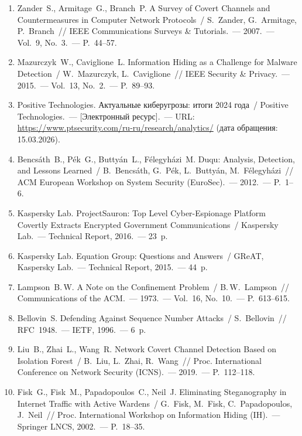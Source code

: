 \begin{enumerate}
  \item Zander~S., Armitage~G., Branch~P. A Survey of Covert Channels and Countermeasures in Computer Network Protocols~/ S.~Zander, G.~Armitage, P.~Branch~// IEEE Communications Surveys \& Tutorials.~--- 2007.~--- Vol.~9, No.~3.~--- P.~44--57.

  \item Mazurczyk~W., Caviglione~L. Information Hiding as a Challenge for Malware Detection~/ W.~Mazurczyk, L.~Caviglione~// IEEE Security \& Privacy.~--- 2015.~--- Vol.~13, No.~2.~--- P.~89--93.

  \item Positive Technologies. Актуальные киберугрозы: итоги 2024 года~/ Positive Technologies.~--- [Электронный ресурс].~--- URL: \url{https://www.ptsecurity.com/ru-ru/research/analytics/} (дата обращения: 15.03.2026).

  \item Bencs\'{a}th~B., P\'{e}k~G., Butty\'{a}n~L., F\'{e}legyh\'{a}zi~M. Duqu: Analysis, Detection, and Lessons Learned~/ B.~Bencs\'{a}th, G.~P\'{e}k, L.~Butty\'{a}n, M.~F\'{e}legyh\'{a}zi~// ACM European Workshop on System Security (EuroSec).~--- 2012.~--- P.~1--6.

  \item Kaspersky Lab. ProjectSauron: Top Level Cyber-Espionage Platform Covertly Extracts Encrypted Government Communications~/ Kaspersky Lab.~--- Technical Report, 2016.~--- 23~p.

  \item Kaspersky Lab. Equation Group: Questions and Answers~/ GReAT, Kaspersky Lab.~--- Technical Report, 2015.~--- 44~p.

  \item Lampson~B.\,W. A Note on the Confinement Problem~/ B.\,W.~Lampson~// Communications of the ACM.~--- 1973.~--- Vol.~16, No.~10.~--- P.~613--615.

  \item Bellovin~S. Defending Against Sequence Number Attacks~/ S.~Bellovin~// RFC~1948.~--- IETF, 1996.~--- 6~p.

  \item Liu~B., Zhai~L., Wang~R. Network Covert Channel Detection Based on Isolation Forest~/ B.~Liu, L.~Zhai, R.~Wang~// Proc. International Conference on Network Security (ICNS).~--- 2019.~--- P.~112--118.

  \item Fisk~G., Fisk~M., Papadopoulos~C., Neil~J. Eliminating Steganography in Internet Traffic with Active Wardens~/ G.~Fisk, M.~Fisk, C.~Papadopoulos, J.~Neil~// Proc. International Workshop on Information Hiding (IH).~--- Springer LNCS, 2002.~--- P.~18--35.


\end{enumerate}
